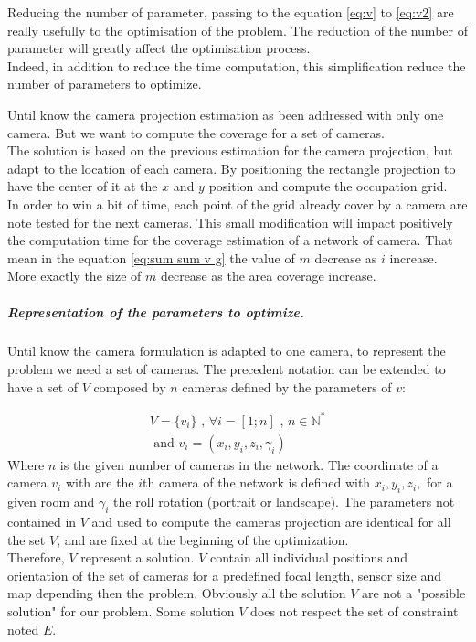 Reducing the number of  parameter, passing to the equation \ref{eq:v} to \ref{eq:v2} are really usefully to the optimisation of the problem. The reduction of the number of parameter will  greatly affect the optimisation process.\\
 Indeed, in addition to reduce the time computation, this simplification reduce the number of parameters to optimize.   

Until know the camera projection estimation as been addressed with only one camera. But we want to compute the coverage for a set of cameras. \\
The solution is based on the previous estimation for the camera projection, but adapt to the location of each camera. By  positioning the rectangle projection to have the center of it at the $x$ and $y$ position and compute the occupation grid.\\

In order to win a bit of time, each point of the grid already cover by a camera are note tested for the next cameras. This small modification will impact positively the computation time for the coverage estimation of a network of camera. That mean in the equation \ref{eq:sum sum v g} the value of $m$ decrease as $i$ increase. More exactly  the size of $m$ decrease as  the area coverage increase.  
\\

\subparagraph{Representation of the parameters to optimize. \\}

Until know the camera formulation is adapted to one camera, to represent the problem we need a set of cameras. The precedent notation can be extended to have a set of $V$ composed by $n$ cameras defined by the parameters of $v$:

	\begin{equation}\label{eq:V}
		\begin{split}
			V= \{v_i\} \mbox{  , } \forall i=[1;n] \mbox{ , } n\in \mathbb{N}^*
				\\
			\mbox{ and } v_i= (x_i,y_i,z_i,\gamma_i)
		\end{split}
	\end{equation}
\noindent Where $n$ is the given number of cameras in the network. The coordinate of a camera $v_i$ with are the $i$th camera of the network is defined  with $x_i, y_i, z_i,$ for a given room and $\gamma_i$ the roll rotation (portrait or landscape). The parameters not contained in $V$ and used to compute the cameras projection are  identical for all the set $V$, and are fixed at the beginning of the optimization.\\
Therefore, $V$ represent a solution. $V$ contain all individual positions and orientation of the set of cameras for a predefined focal length, sensor size and map depending then the problem.%
Obviously all the solution $V$ are not a "possible solution" for our problem. Some solution $V$ does not respect the set of constraint noted $E$.

